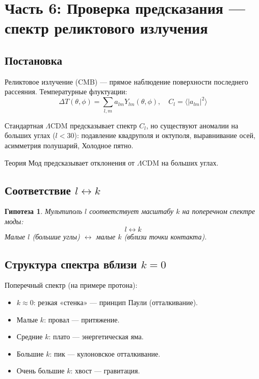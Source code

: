 \documentclass[11pt,a4paper]{article}
\newtheorem{hypothesis}{Гипотеза}[section]
\theoremstyle{definition}
\begin{document}
\newpage
\section{Часть 6: Проверка предсказания --- спектр реликтового излучения}

\subsection{Постановка}

Реликтовое излучение (CMB) --- прямое наблюдение поверхности последнего рассеяния. Температурные флуктуации:
\begin{equation}
    \Delta T(\theta, \phi) = \sum_{l,m} a_{lm} Y_{lm}(\theta, \phi), \quad C_l = \langle |a_{lm}|^2 \rangle
\end{equation}

Стандартная $\Lambda$CDM предсказывает спектр $C_l$, но существуют аномалии на больших углах ($l < 30$): подавление квадруполя и октуполя, выравнивание осей, асимметрия полушарий, Холодное пятно.

Теория Мод предсказывает отклонения от $\Lambda$CDM на больших углах.

\subsection{Соответствие $l \leftrightarrow k$}

\begin{hypothesis}
Мультиполь $l$ соответствует масштабу $k$ на поперечном спектре моды:
\begin{equation}
    l \leftrightarrow k
\end{equation}
Малые $l$ (большие углы) $\leftrightarrow$ малые $k$ (вблизи точки контакта).
\end{hypothesis}

\subsection{Структура спектра вблизи $k = 0$}

Поперечный спектр (на примере протона):
\begin{itemize}
    \item $k \approx 0$: резкая «стенка» --- принцип Паули (отталкивание).
    \item Малые $k$: провал --- притяжение.
    \item Средние $k$: плато --- энергетическая яма.
    \item Большие $k$: пик --- кулоновское отталкивание.
    \item Очень большие $k$: хвост --- гравитация.
\end{itemize}
\end{document}

